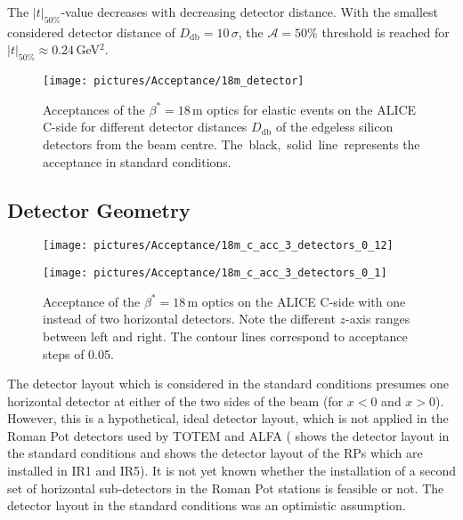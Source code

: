 The $|t|_{50\%}$-value decreases with decreasing detector distance. With the smallest considered detector distance of $D_{\text{db}}=10\,\sigma$, the $\mathcal{A}=50\%$ threshold is reached for $|t|_{50\%}\approx 0.24\,$GeV$^2$.   
\begin{figure}[h]
\centering
\texttt{[image: pictures/Acceptance/18m\_detector]}
    \caption{Acceptances of the $\beta^*=18\,$m optics for elastic events on the ALICE C-side for different detector distances $D_{\text{db}}$ of the edgeless silicon detectors from the beam centre. \mbox{The black, solid line represents} the acceptance in standard conditions.}
    \label{fig:acc_func_sigma}
\end{figure}

\subsection{Detector Geometry}\label{chap:acceptance_with_one_horizontal_detector}
\begin{figure}[h]
\begin{minipage}[t]{.5\textwidth}
  \texttt{[image: pictures/Acceptance/18m\_c\_acc\_3\_detectors\_0\_12]}
\end{minipage}
\hfill
\begin{minipage}[t]{0.5\textwidth}
\centering
\texttt{[image: pictures/Acceptance/18m\_c\_acc\_3\_detectors\_0\_1]}
\end{minipage}
\caption{Acceptance of the $\beta^*=18\,$m optics on the ALICE C-side with one instead of two horizontal detectors. Note the different $z$-axis ranges between left and right. The contour lines correspond to acceptance steps of 0.05.}
\label{fig:non_standard_detector}
\end{figure}
The detector layout which is considered in the standard conditions presumes one horizontal detector at either of the two sides of the beam (for $x<0$ and $x>0$).  However, this is a \mbox{hypothetical}, ideal detector layout, which is not applied in the Roman Pot detectors used by TOTEM and ALFA ( shows the detector layout in the standard conditions and  shows the detector layout of the RPs which are installed in IR1 and IR5). It is not yet known whether the installation of a second set of horizontal sub-detectors in the Roman Pot stations is feasible or not. The detector layout in the standard conditions was an optimistic assumption.

\newpage

